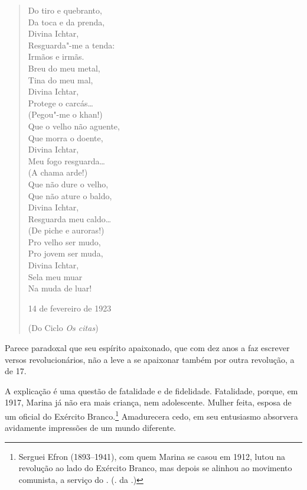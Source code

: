 \begin{verse}
Do tiro e quebranto, \\
Da toca e da prenda, \\
Divina Ichtar, \\
Resguarda"-me a tenda: \\[8pt]
Irmãos e irmãs. \\[8pt]
Breu do meu metal, \\
Tina do meu mal, \\
Divina Ichtar, \\
Protege o carcás\ldots{} \\[8pt]
(Pegou"-me o khan!) \\[8pt]
Que o velho não aguente, \\
Que morra o doente, \\
Divina Ichtar, \\
Meu fogo resguarda\ldots{} \\[8pt]
(A chama arde!) \\[8pt]
Que não dure o velho, \\
Que não ature o baldo, \\
Divina Ichtar, \\
Resguarda meu caldo\ldots{} \\[8pt]
(De piche e auroras!) \\[8pt]
Pro velho ser mudo, \\
Pro jovem ser muda, \\
Divina Ichtar, \\
Sela meu muar \\
Na muda de luar!

14 de fevereiro de 1923

(Do Ciclo \emph{Os citas})

\end{verse}

Parece paradoxal que seu espírito apaixonado, que com dez anos a
faz escrever versos revolucionários, não a leve a se apaixonar
também por outra revolução, a de 17.

A explicação é uma questão de fatalidade e de fidelidade.
Fatalidade, porque, em 1917, Marina já não era mais criança,
nem adolescente. Mulher feita, esposa de um oficial do Exército
Branco.\footnote{Serguei Efron (1893--1941), com quem Marina se
casou em 1912, lutou na revolução ao lado do Exército Branco, mas
depois se alinhou ao movimento comunista, a serviço do
. (. da .)} Amadurecera cedo, em
seu entusiasmo absorvera avidamente impressões de um mundo
diferente.

